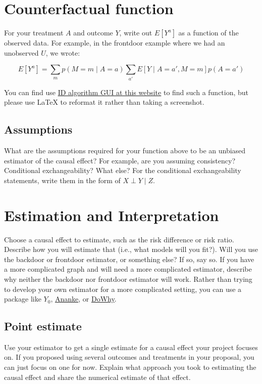 \documentclass[12pt]{article}
\begin{document}
\section{Counterfactual function} \label{sec:counterfactual}

For your treatment $A$ and outcome $Y$, write out $E[Y^a]$ as a function of the
observed data. For example, in the frontdoor example where we had an unobserved
$U$, we wrote:

\[
E[Y^a] = \sum_m p(M=m \mid A=a) \sum_{a'} E[Y \mid A=a', M=m] p(A=a')
\]

You can find use \href{https://aci-esp.shinyapps.io/shiny-short-example/}{ID
algorithm GUI at this website} to find such a function, but please use LaTeX to
reformat it rather than taking a screenshot.

\subsection{Assumptions}

What are the assumptions required for your function above to be an unbiased
estimator of the causal effect? For example, are you assuming consistency?
Conditional exchangeability? What else? For the conditional exchangeability
statements, write them in the form of $X \perp Y \mid Z$.

\section{Estimation and Interpretation} \label{sec:estimation}

Choose a causal effect to estimate, such as the risk difference or risk ratio.
Describe how you will estimate that (i.e., what models will you fit?).  Will
you use the backdoor or frontdoor estimator, or something else? If so, say so.
If you have a more complicated graph and will need a more complicated
estimator, describe why neither the backdoor nor frontdoor estimator will work.
Rather than trying to develop your own estimator for a more complicated
setting, you can use a package like
\href{https://github.com/y0-causal-inference/y0}{\tt $Y_0$},
\href{https://gitlab.com/causal/ananke}{Ananke}, or
\href{https://microsoft.github.io/dowhy/}{DoWhy}.

\subsection{Point estimate}

Use your estimator to get a single estimate for a causal effect your project
focuses on. If you proposed using several outcomes and treatments in your
proposal, you can just focus on one for now. Explain what approach you took to
estimating the causal effect and share the numerical estimate of that effect.
\end{document}
